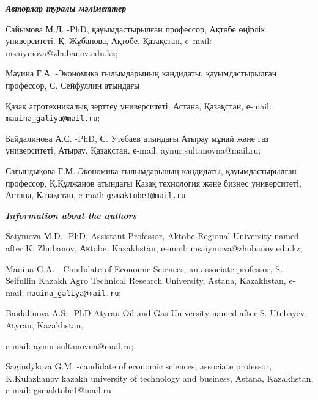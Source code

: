 \begin{authorinfo}

  \hspace{1em}\emph{{\bfseries Авторлар туралы мәліметтер}}

Сайымова М.Д. -PhD, қауымдастырылған профессор, Ақтөбе өңірлік
университеті. Қ. Жұбанова, Ақтөбе, Қазақстан, e--mail:
\href{mailto:77mika-07@mail.ru}{msaiymova@zhubanov.edu.kz};

Мауина Ғ.А. -Экономика ғылымдарының кандидаты, қауымдастырылған
профессор, С. Сейфуллин атындағы

Қазақ агротехникалық зерттеу университеті, Астана, Қазақстан, е-mail:
\href{mailto:mauina_galiya@mail.ru}{\nolinkurl{mauina\_galiya@mail.ru}};

Байдалинова А.С. -PhD, С. Утебаев атындағы Атырау мұнай және газ
университеті, Атырау, Қазақстан, е-mail: aynur.sultanovna@mail.ru;

Сағындықова Г.М.-Экономика ғылымдарының кандидаты, қауымдастырылған
профессор, Қ.Құлжанов атындағы Қазақ технология және бизнес
университеті, Астана, Қазақстан, e-mail:
\href{mailto:gsmaktobe1@mail.ru}{\nolinkurl{gsmaktobe1@mail.ru}}

\hspace{1em}\emph{{\bfseries Information about the authors}}

Saiymova М.D. -PhD, Assistant Professor, Aktobe Regional University
named after K. Zhubanov, Акtobe, Kazakhstan, e--mail:
msaiymova@zhubanov.edu.kz;

Mauina G.A. - Candidate of Economic Sciences, an associate professor, S.
Seifullin Kazakh Agro Technical Research University, Astana, Kazakhstan,
e-mail:
\href{mailto:mauina_galiya@mail.ru}{\nolinkurl{mauina\_galiya@mail.ru}};

Baidalinova A.S. -PhD Atyrau Oil and Gas University named after S.
Utebayev, Atyrau, Kazakhstan,

e-mail: aynur.sultanovna@mail.ru;

Sagindykova G.M. -candidate of economic sciences, associate professor,
K.Kulazhanov kazakh university of technology and business, Astana,
Kazakhstan, e-mail: gsmaktobe1@mail.ru

\end{authorinfo}
